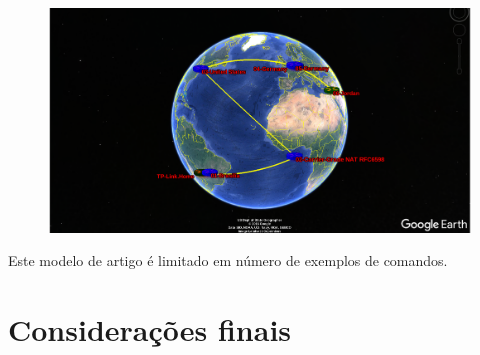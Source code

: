 \documentclass[
	article,			%
	11pt,				%
	oneside,			%
	a4paper,			%
	english,			%
	brazil,				%
	sumario=tradicional
	]{abntex2}
\begin{document}
\begin{figure}[!h]
	\centering
	\includegraphics[scale=0.2]{./google-earh.png}
	
	\label{Rotulo}
\end{figure}


Este modelo de artigo é limitado em número de exemplos de comandos.

% 

\section{Considerações finais}

\lipsum[1]

\begin{citacao}
\lipsum[2]
\end{citacao}

\lipsum[3]


\end{document}
